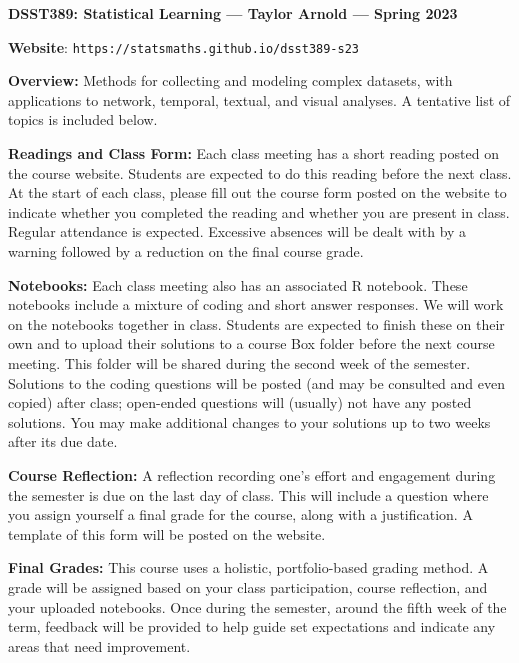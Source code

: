 \documentclass[11pt, a4paper]{article}
\begin{document}
\begin{center}
\textbf{DSST389: Statistical Learning --- Taylor Arnold --- Spring 2023}
\end{center}

\vspace{0.5cm}

\textbf{Website}: \texttt{https://statsmaths.github.io/dsst389-s23}

\bigskip

\textbf{Overview:}
Methods for collecting and modeling complex datasets, with applications
to network, temporal, textual, and visual analyses. A tentative list of
topics is included below.

\bigskip

\textbf{Readings and Class Form:}
Each class meeting has a short reading posted on the course website.
Students are expected to do this reading before the next class. At the start
of each class, please fill out the course form posted on the website to indicate
whether you completed the reading and whether you are present in class. 
Regular attendance is expected. Excessive absences will be dealt with by a
warning followed by a reduction on the final course grade.

\bigskip

\textbf{Notebooks:}
Each class meeting also has an associated R notebook.
These notebooks include a mixture of coding and short answer
responses. We will work on the notebooks together in class. Students are
expected to finish these on their own and to upload their solutions to a
course Box folder before the next course meeting. This folder will be shared
during the second week of the semester. Solutions to the coding questions
will be posted (and may be consulted and even copied) after class; open-ended
questions will (usually) not have any posted solutions. You may make
additional changes to your solutions up to two weeks after its due date.

\bigskip

\textbf{Course Reflection:}
A reflection recording one's effort and engagement during the semester
is due on the last day of class. This will include a question where you assign
yourself a final grade for the course, along with a justification.
A template of this form will be posted on the website.

\bigskip

\textbf{Final Grades:}
This course uses a holistic, portfolio-based grading method. A grade will
be assigned based on your class participation, course reflection, and your
uploaded notebooks. Once during the semester, around the fifth week of the
term, feedback will be provided to help guide set expectations and indicate
any areas that need improvement.
\end{document}

